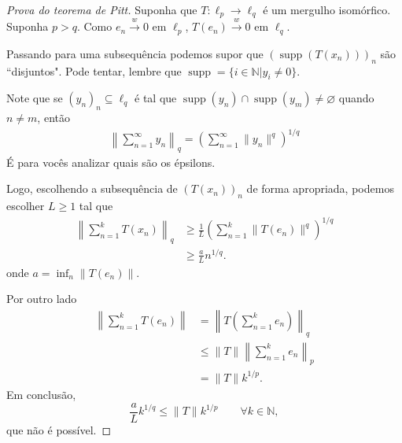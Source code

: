 \documentclass[portuguese]{article}
\theoremstyle{definition}
\newcommand{\N}{\mathbb{N}}
\begin{document}
	\begin{proof}[Prova do teorema de Pitt]
		Suponha que $T:\ell_p\to\ell_q$ é um mergulho isomórfico. Suponha $p>q$. Como $e_n\overset{w}{\to}0$ em $\ell_p$, $T(e_n)\overset{w}{\to}0$ em $\ell_q$.
		
		Passando para uma subsequência podemos supor que $\left(\operatorname{supp}(T(x_n))\right)_n$ são ``disjuntos". {\color{orange}Pode tentar, lembre que $\operatorname{supp}=\{i\in\N|y_i\neq0\}$.}
		
		
		Note que se $(y_n)_n\subseteq\ell_q$ é tal que $\operatorname{supp}(y_n)\cap\operatorname{supp}(y_m)\neq\varnothing$ quando $n\neq m$, então
		\begin{align*}
			\left\|\sum_{n=1}^\infty y_n\right\|_q=\left(\sum_{n=1}^\infty\| y_n\|^q\right)^{1/q}
		\end{align*}
		{\color{orange}É para vocês analizar quais são os épsilons.}
		
		Logo, escolhendo a subsequência de $(T(x_n))_n$ de forma apropriada, podemos escolher $L\geq1$ tal que
		\begin{align*}
			\left\|\sum_{n=1}^k T(x_n)\right\|_q&\geq\frac{1}{L}\left(\sum_{n=1}^k\| T(e_n)\|^q\right)^{1/q}\\
			&\geq \frac{a}{L}n^{1/q}.
		\end{align*}
		onde $a=\inf_n\| T(e_n)\|$.
		
		Por outro lado
		\begin{align*}
			\left\|\sum_{n=1}^kT(e_n)\right\|&=\left\| T\left(\sum_{n=1}^ke_n\right)\right\|_q\\
			&\leq\| T\|\left\|\sum_{n=1}^ke_n\right\|_p\\
			&=\| T\| k^{1/p}.
		\end{align*}
		Em conclusão,
		\[\frac{a}{L}k^{1/q}\leq\| T\| k^{1/p}\qquad\forall k\in\N,\]
		que não é possível.
	\end{proof}
\end{document}
